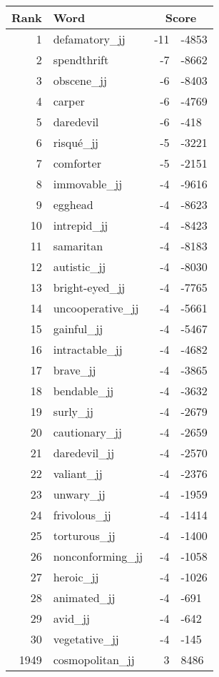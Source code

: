 \begin{longtable}[!htbp]{| rlr@{.}l |}
    \hline
    \textbf{Rank} & \textbf{Word} & \multicolumn{2}{c|}{\textbf{Score}} \\
    \hline
    \endhead
    1 & defamatory\_jj & -11 & -4853 \\
    2 & spendthrift & -7 & -8662 \\
    3 & obscene\_jj & -6 & -8403 \\
    4 & carper & -6 & -4769 \\
    5 & daredevil & -6 & -418 \\
    6 & risqué\_jj & -5 & -3221 \\
    7 & comforter & -5 & -2151 \\
    8 & immovable\_jj & -4 & -9616 \\
    9 & egghead & -4 & -8623 \\
    10 & intrepid\_jj & -4 & -8423 \\
    11 & samaritan & -4 & -8183 \\
    12 & autistic\_jj & -4 & -8030 \\
    13 & bright-eyed\_jj & -4 & -7765 \\
    14 & uncooperative\_jj & -4 & -5661 \\
    15 & gainful\_jj & -4 & -5467 \\
    16 & intractable\_jj & -4 & -4682 \\
    17 & brave\_jj & -4 & -3865 \\
    18 & bendable\_jj & -4 & -3632 \\
    19 & surly\_jj & -4 & -2679 \\
    20 & cautionary\_jj & -4 & -2659 \\
    21 & daredevil\_jj & -4 & -2570 \\
    22 & valiant\_jj & -4 & -2376 \\
    23 & unwary\_jj & -4 & -1959 \\
    24 & frivolous\_jj & -4 & -1414 \\
    25 & torturous\_jj & -4 & -1400 \\
    26 & nonconforming\_jj & -4 & -1058 \\
    27 & heroic\_jj & -4 & -1026 \\
    28 & animated\_jj & -4 & -691 \\
    29 & avid\_jj & -4 & -642 \\
    30 & vegetative\_jj & -4 & -145 \\
    1949 & cosmopolitan\_jj & 3 & 8486 \\

\end{longtable}
